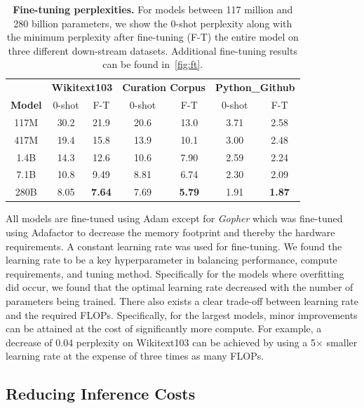 \documentclass[11pt, a4paper, logo, internal, copyright, nonumbering]{deepmind}
\newcommand{\gopher}{\textit{Gopher}\xspace}
\begin{document}
\begin{table}[t]
    \centering
    \begin{tabular}{c|cc|cc|cc}
    \toprule
        \textbf{} & \multicolumn{2}{c}{\textbf{Wikitext103}} & \multicolumn{2}{c}{\textbf{Curation Corpus}} &
        \multicolumn{2}{c}{\textbf{Python\_Github}}\\
        \textbf{Model} & 0-shot & F-T& 0-shot & F-T & 0-shot & F-T \\        
        \midrule
         117M & 30.2 & 21.9 & 20.6 & 13.0 & 3.71 & 2.58\\
         417M & 19.4 & 15.8 & 13.9 & 10.1 & 3.00 & 2.48 \\
         1.4B & 14.3 & 12.6 & 10.6 & 7.90 & 2.59 & 2.24  \\
         7.1B   & 10.8 & 9.49  & 8.81  & 6.74 & 2.30 & 2.09  \\
         280B & 8.05  & \textbf{7.64}  & 7.69  & \textbf{5.79} & 1.91 & \textbf{1.87} \\
         \bottomrule
    \end{tabular}
    \caption{\textbf{Fine-tuning perplexities.} For models between 117 million and 280 billion parameters, we show the 0-shot perplexity along with the minimum perplexity after fine-tuning (F-T) the entire model on three different down-stream datasets.
    Additional fine-tuning results can be found in~\autoref{fig:ft}.}
    \label{tab:ft}
\end{table}

All models are fine-tuned using Adam except for \gopher which was fine-tuned using Adafactor \citep{shazeer2018Adafactor} to decrease the memory footprint and thereby the hardware requirements.
A constant learning rate was used for fine-tuning.
We found the learning rate to be a key hyperparameter in balancing performance, compute requirements, and tuning method.
Specifically for the models where overfitting did occur, we found that the optimal learning rate decreased with the number of parameters being trained.
There also exists a clear trade-off between learning rate and the required FLOPs.
Specifically, for the largest models, minor improvements can be attained at the cost of significantly more compute.
For example, a decrease of 0.04 perplexity on Wikitext103 can be achieved by using a 5$\times$ smaller learning rate at the expense of three times as many FLOPs.

\subsection{Reducing Inference Costs}
\label{sec:reducinginference}
\end{document}
